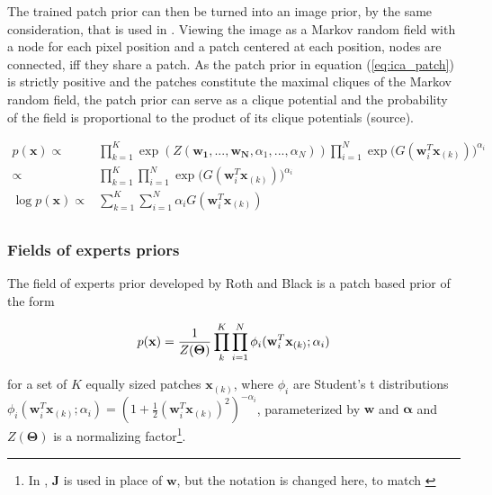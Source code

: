 \documentclass{article}
\begin{document}
The trained patch prior can then be turned into an image prior, by the same consideration, that is used in \cite{foe}. Viewing the image as a Markov random field with a node for each pixel position and a patch centered at each position, nodes are connected, iff they share a patch. As the patch prior in equation (\ref{eq:ica_patch}) is strictly positive and the patches constitute the maximal cliques of the Markov random field, the patch prior can serve as a clique potential and the probability of the field is proportional to the product of its clique potentials (source).

\begin{equation}
\begin{aligned}
p(\mathbf{x}) \propto& \prod_{k=1}^K \exp (Z(\mathbf{w_1},...,\mathbf{w_N}, \alpha_1, ... , \alpha_N)) \prod_{i=1}^{N} \exp \big(G(\mathbf{w}_i^T \mathbf{x}_{(k)}) \big)^{\alpha_i}  \\
\propto& \prod_{k=1}^K \prod_{i=1}^{N} \exp \big(G(\mathbf{w}_i^T \mathbf{x}_{(k)}) \big)^{\alpha_i}  \\
\log p(\mathbf{x}) \propto& \sum_{k=1}^K \sum_{i=1}^{N} \alpha_i G(\mathbf{w}_i^T \mathbf{x}_{(k)}) \\
\end{aligned}
\label{eq:ica_img}
\end{equation}



\subsubsection{Fields of experts priors}

The field of experts prior developed by Roth and Black \cite{foe} is a patch based prior of the form 

\begin{equation}
	p(\mathbf{x}) = \frac{1}{Z(\bm{\Theta})} \prod_{k}^K \prod_{i=1}^{N} \phi_i (\mathbf{w}_i^T \mathbf{x}_{(k)} ; \alpha_i) \\
\end{equation}

for a set of $K$ equally sized patches $\mathbf{x}_{(k)}$, where $\phi_i$ are Student's t distributions $\phi_i(\mathbf{w}_i^T \mathbf{x}_{(k)} ; \alpha_i) = (1 + \frac{1}{2}(\mathbf{w}_i^T \mathbf{x}_{(k)})^2 )^{-\alpha_i}$, parameterized by $\mathbf{w}$ and $\mathbf{\alpha}$ and $Z(\bm{\Theta})$ is a normalizing factor\footnote{In \cite{foe}, $\mathbf{J}$ is used in place of $\mathbf{w}$, but the notation is changed here, to match \cite{hyvarinen2003}}. 
\end{document}
